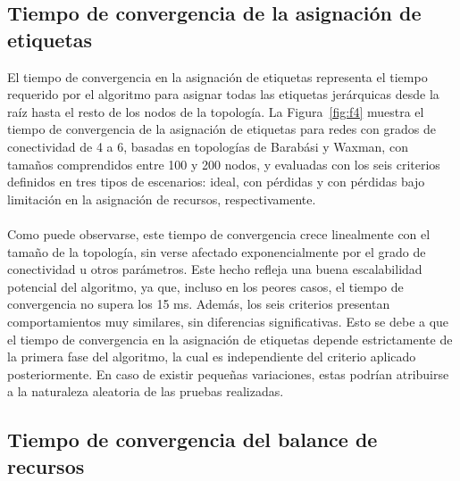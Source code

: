 \subsection{Tiempo de convergencia de la asignación de etiquetas} 

El tiempo de convergencia en la asignación de etiquetas representa el tiempo requerido por el algoritmo para asignar todas las etiquetas jerárquicas desde la raíz hasta el resto de los nodos de la topología. La Figura~\ref{fig:f4} muestra el tiempo de convergencia de la asignación de etiquetas para redes con grados de conectividad de 4 a 6, basadas en topologías de Barabási y Waxman, con tamaños comprendidos entre 100 y 200 nodos, y evaluadas con los seis criterios definidos en tres tipos de escenarios: ideal, con pérdidas y con pérdidas bajo limitación en la asignación de recursos, respectivamente.\\
\\
Como puede observarse, este tiempo de convergencia crece linealmente con el tamaño de la topología, sin verse afectado exponencialmente por el grado de conectividad u otros parámetros. Este hecho refleja una buena escalabilidad potencial del algoritmo, ya que, incluso en los peores casos, el tiempo de convergencia no supera los 15 ms. Además, los seis criterios presentan comportamientos muy similares, sin diferencias significativas. Esto se debe a que el tiempo de convergencia en la asignación de etiquetas depende estrictamente de la primera fase del algoritmo, la cual es independiente del criterio aplicado posteriormente. En caso de existir pequeñas variaciones, estas podrían atribuirse a la naturaleza aleatoria de las pruebas realizadas.


\subsection{Tiempo de convergencia del balance de recursos} 

